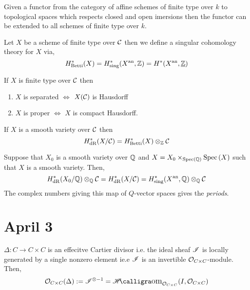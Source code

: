 \documentclass[12pt]{article}
\begin{document}
\begin{theorem}
Given a functor from the category of affine schemes of finite type over $k$ to topological spaces which respects closed and open imersions then the functor can be extended to all schemes of finite type over $k$. 
\end{theorem}

\begin{definition}
Let $X$ be a scheme of finite type over $\C$ then we define a singular cohomology theory for $X$ via,
\[ H^*_{\text{Betti}}(X) = H^*_{\text{sing}}(X^{\mathrm{an}}, \mathbb{Z}) = H^*(X^{\mathrm{an}}, \underline{\mathbb{Z}}) \]
\end{definition}

\begin{lemma}
If $X$ is finite type over $\C$ then 
\begin{center}
\begin{enumerate}
\item $X$ is separated $\iff$ $X(\C)$ is Hausdorff 
\item $X$ is proper $\iff$ $X$ is compact Hausdorff. 
\end{enumerate}
\end{center}
\end{lemma}

\begin{theorem}[Grothendieck]
If $X$ is a smooth variety over $\C$ then 
\[ H^*_{\dR}(X/\C) = H^*_{\text{Betti}}(X) \otimes_\Z \C \] 
\end{theorem}

\begin{theorem}
Suppose that $X_0$ is a smooth variety over $\mathbb{Q}$ and $X = X_0 \times_{\mathrm{Spec}\left( \mathbb{Q} \right)} \mathrm{Spec}\left( X \right)$ such that $X$ is a smooth variety. Then,
\[ H^*_{\dR}(X_0 / \Q) \otimes_\Q \C = H_{\dR}^*(X/\C) = H^*_{\text{sing}}(X^\an, \Q) \otimes_\Q \C \] 
The complex numbers giving this map of $Q$-vector spaces gives the \textit{periods}.
\end{theorem}

\renewcommand{\C}{\mathcal{C}}

\section{April 3}

$\Delta : C \to C \times C$ is an effecitve Cartier divisor i.e. the ideal sheaf $\mathscr{I}$ is locally generated by a single nonzero element ie.e $\mathscr{I}$ is an invertible $\mathcal{O}_{C\times C}$-module. Then,
\[ \struct{C \times C}(\Delta) := \I^{\otimes -1} = \shHomover{\struct{C \times C}}{I}{\struct{C \times C}} \]
\end{document}
